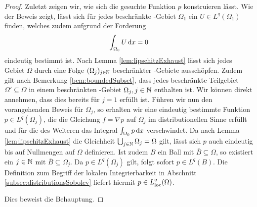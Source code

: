 \begin{proof}
  Zuletzt zeigen wir, wie sich die gesuchte Funktion $p$ konstruieren lässt.
  Wie der Beweis zeigt, lässt sich für jedes beschränkte \lipschitz\hyp{}Gebiet $\Omega_1$ ein $U \in L^q(\Omega_1)$ finden, welches zudem aufgrund der Forderung 
  $$
  \int_{\Omega_0} U \, {\operatorname{d}\!{x}} = 0
  $$
  eindeutig bestimmt ist.
  Nach Lemma \ref{lem:lipschitzExhaust} lässt sich jedes Gebiet $\Omega$ durch eine Folge $(\Omega_j)_{j \in \mathbb{N}}$ beschränkter \lipschitz\hyp{}Gebiete ausschöpfen.
  Zudem gilt nach Bemerkung \ref{bem:boundedSubset}, dass jedes beschränkte Teilgebiet $\Omega' \subseteq \Omega$ in einem beschränkten \lipschitz\hyp{}Gebiet $\Omega_j, j \in \mathbb{N}$ enthalten ist.
  Wir können direkt annehmen, dass dies bereits für $j = 1$ erfüllt ist.
  Führen wir nun den vorangehenden Beweis für $\Omega_j$, so erhalten wir eine eindeutig bestimmte Funktion $p \in L^q(\Omega_j)$, die die Gleichung $f = \nabla p$ auf $\Omega_j$ im distributionellen Sinne erfüllt und für die des Weiteren das Integral $\int_{\Omega_0} p \, {\operatorname{d}\!{x}}$ verschwindet.
  Da nach Lemma \ref{lem:lipschitzExhaust} die Gleichheit $\bigcup_{j \in \mathbb{N}} \Omega_j = \Omega$ gilt, lässt sich $p$ auch eindeutig bis auf Nullmengen auf $\Omega$ definieren.
  Ist zudem $B$ ein Ball mit $\overline B \subseteq \Omega$, so existiert ein $j \in \mathbb{N}$ mit $\overline B \subseteq \Omega_j$.
  Da $p \in L^q(\Omega_j)$ gilt, folgt sofort $p \in L^q(B)$.
  Die Definition zum Begriff der lokalen Integrierbarkeit in Abschnitt \ref{subsec:distributionsSobolev} liefert hiermit $p \in L^q_{\operatorname{loc}}(\Omega)$.

  Dies beweist die Behauptung.
\end{proof}

